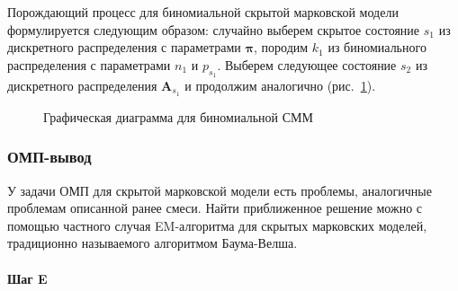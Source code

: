 Порождающий процесс для биномиальной скрытой марковской модели формулируется
следующим образом: случайно выберем скрытое состояние $s_1$ из дискретного
распределения с параметрами $\mathbf{\pi}$, породим $k_1$ из биномиального
распределения с параметрами $n_1$ и $p_{s_1}$. Выберем следующее состояние
$s_2$ из дискретного распределения $\mathbf{A}_{s_1}$ и продолжим аналогично
(рис.~\ref{fig:generative-hmm}).

\begin{figure}[h]
  \centering
  \caption{Графическая диаграмма для биномиальной СММ}
  \label{fig:generative-hmm}
\end{figure}


\subsubsection{ОМП-вывод}

У задачи ОМП для скрытой марковской модели есть проблемы, аналогичные проблемам описанной ранее
смеси. Найти приближенное решение можно с помощью частного случая EM-алгоритма для скрытых
марковских моделей, традиционно называемого алгоритмом Баума-Велша.

\paragraph{Шаг E}

